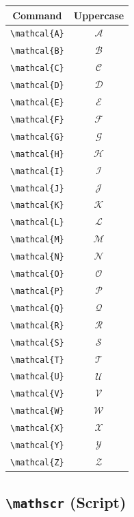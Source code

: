 \documentclass[12pt,a4paper]{article}
\begin{document}
\begin{longtable}{|c|c|}
\hline
\textbf{Command} & \textbf{Uppercase} \\
\hline
\verb|\mathcal{A}| & $\mathcal{A}$ \\ %
\verb|\mathcal{B}| & $\mathcal{B}$ \\ %
\verb|\mathcal{C}| & $\mathcal{C}$ \\ %
\verb|\mathcal{D}| & $\mathcal{D}$ \\ %
\verb|\mathcal{E}| & $\mathcal{E}$ \\ %
\verb|\mathcal{F}| & $\mathcal{F}$ \\ %
\verb|\mathcal{G}| & $\mathcal{G}$ \\ %
\verb|\mathcal{H}| & $\mathcal{H}$ \\ %
\verb|\mathcal{I}| & $\mathcal{I}$ \\ %
\verb|\mathcal{J}| & $\mathcal{J}$ \\ %
\verb|\mathcal{K}| & $\mathcal{K}$ \\ %
\verb|\mathcal{L}| & $\mathcal{L}$ \\ %
\verb|\mathcal{M}| & $\mathcal{M}$ \\ %
\verb|\mathcal{N}| & $\mathcal{N}$ \\ %
\verb|\mathcal{O}| & $\mathcal{O}$ \\ %
\verb|\mathcal{P}| & $\mathcal{P}$ \\ %
\verb|\mathcal{Q}| & $\mathcal{Q}$ \\ %
\verb|\mathcal{R}| & $\mathcal{R}$ \\ %
\verb|\mathcal{S}| & $\mathcal{S}$ \\ %
\verb|\mathcal{T}| & $\mathcal{T}$ \\ %
\verb|\mathcal{U}| & $\mathcal{U}$ \\ %
\verb|\mathcal{V}| & $\mathcal{V}$ \\ %
\verb|\mathcal{W}| & $\mathcal{W}$ \\ %
\verb|\mathcal{X}| & $\mathcal{X}$ \\ %
\verb|\mathcal{Y}| & $\mathcal{Y}$ \\ %
\verb|\mathcal{Z}| & $\mathcal{Z}$ \\ %
\hline
\end{longtable}

\newpage

\subsection*{\texttt{\textbackslash{}mathscr} (Script)}
\end{document}
